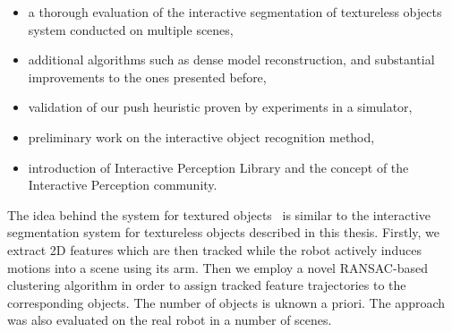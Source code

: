 \begin{itemize} 
\item a thorough evaluation of the interactive segmentation of textureless objects system conducted on multiple scenes, 
\item additional algorithms such as dense model reconstruction, and substantial improvements to the ones presented before, 
\item validation of our push heuristic proven by experiments in a simulator,
\item preliminary work on the interactive object recognition method, 
\item introduction of Interactive Perception Library and the concept of the Interactive Perception community. 
\end{itemize} 



%
%
%

%

The idea behind the system for textured objects~\cite{bersch12interactive} is similar to the interactive segmentation system for textureless objects described in this thesis.
Firstly, we extract 2D features which are then tracked while the robot actively induces
motions into a scene using its arm. Then we employ a novel RANSAC-based clustering algorithm in order to assign tracked feature trajectories to the corresponding objects. The number of objects is uknown a priori. The approach was also evaluated on the real robot in a number of scenes.
%

